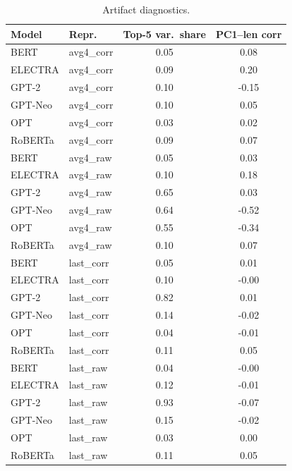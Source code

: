 \begin{table}[!ht]
\centering
\footnotesize
\begin{tabular}{llcc}
\toprule
\textbf{Model} & \textbf{Repr.} & \textbf{Top-5 var.\ share} & \textbf{PC1--len corr} \\
\midrule
BERT & avg4_corr & 0.05 & 0.08 \\
ELECTRA & avg4_corr & 0.09 & 0.20 \\
GPT-2 & avg4_corr & 0.10 & -0.15 \\
GPT-Neo & avg4_corr & 0.10 & 0.05 \\
OPT & avg4_corr & 0.03 & 0.02 \\
RoBERTa & avg4_corr & 0.09 & 0.07 \\
BERT & avg4_raw & 0.05 & 0.03 \\
ELECTRA & avg4_raw & 0.10 & 0.18 \\
GPT-2 & avg4_raw & 0.65 & 0.03 \\
GPT-Neo & avg4_raw & 0.64 & -0.52 \\
OPT & avg4_raw & 0.55 & -0.34 \\
RoBERTa & avg4_raw & 0.10 & 0.07 \\
BERT & last_corr & 0.05 & 0.01 \\
ELECTRA & last_corr & 0.10 & -0.00 \\
GPT-2 & last_corr & 0.82 & 0.01 \\
GPT-Neo & last_corr & 0.14 & -0.02 \\
OPT & last_corr & 0.04 & -0.01 \\
RoBERTa & last_corr & 0.11 & 0.05 \\
BERT & last_raw & 0.04 & -0.00 \\
ELECTRA & last_raw & 0.12 & -0.01 \\
GPT-2 & last_raw & 0.93 & -0.07 \\
GPT-Neo & last_raw & 0.15 & -0.02 \\
OPT & last_raw & 0.03 & 0.00 \\
RoBERTa & last_raw & 0.11 & 0.05 \\
\bottomrule
\end{tabular}
\caption{Artifact diagnostics.}
\label{tab:diagnostics}
\end{table}